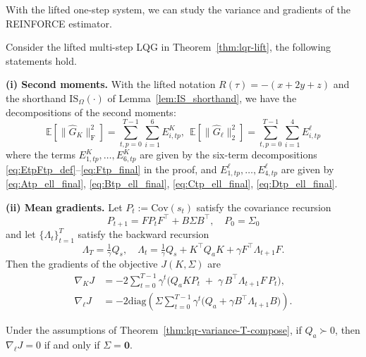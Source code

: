 With the lifted one-step system, we can study the variance and gradients of the REINFORCE estimator.


\begin{theorem}
\label{thm:lqr-variance-T-compose}
Consider the lifted multi-step LQG in Theorem~\ref{thm:lqr-lift}, the following statements hold.

\textbf{(i) Second moments.}
With the lifted notation $R(\tau)=-(x+2y+z)$ and the shorthand
$\mathrm{IS}_\Omega(\cdot)$ of Lemma~\ref{lem:IS_shorthand}, we have the decompositions of the second moments:
$$
\mathbb E\!\left[\|\widehat G_K\|_{\mathrm F}^2\right]=\!\!\!\sum_{t,p=0}^{T-1}\sum_{i=1}^{6}E^{K}_{i,tp},\ \ 
\mathbb E\!\left[\|\widehat G_\ell\|_{2}^2\right]=\!\!\!\sum_{t,p=0}^{T-1}\sum_{i=1}^{4}E^{\ell}_{i,tp}
$$
where the terms $E^{K}_{1,tp},\dots,E^{K}_{6,tp}$ are given by the six-term decompositions \eqref{eq:EtpFtp_def}--\eqref{eq:Ftp_final} in the proof, and $E^{\ell}_{1,tp},\dots,E^{\ell}_{4,tp}$ are given by
\eqref{eq:Atp_ell_final}, \eqref{eq:Btp_ell_final}, \eqref{eq:Ctp_ell_final}, \eqref{eq:Dtp_ell_final}.

\textbf{(ii) Mean gradients.}
Let $P_t:=\mathrm{Cov}(s_t)$ satisfy the covariance recursion
\[
P_{t+1}=F P_t F^\top + B\Sigma B^\top,\quad P_0=\Sigma_0
\]
and let $\{\Lambda_t\}_{t=1}^{T}$ satisfy the backward recursion
\[
\Lambda_T=\tfrac{1}{\gamma}Q_s,\quad
\Lambda_t=\tfrac{1}{\gamma}Q_s + K^\top Q_a K + \gamma F^\top \Lambda_{t+1} F.
\]
Then the gradients of the objective $J(K,\Sigma)$ are
\begin{align}
\nabla_K J
&=
-2\sum_{t=0}^{T-1}\gamma^{t}\Big( Q_a K P_t \;+\; \gamma\, B^\top \Lambda_{t+1} F\, P_t \Big)\label{eq:mean_grad_K},\!\!\\
\nabla_{\ell} J 
&=
-2\mathrm{diag}(\Sigma\sum_{t=0}^{T-1}\gamma^t\Big( Q_a + \gamma B^\top \Lambda_{t+1} B \Big)).
\end{align}
\end{theorem}

\begin{corollary}
\label{cor:lqg_stationary}
Under the assumptions of Theorem~\ref{thm:lqr-variance-T-compose}, if $Q_a \succ 0$, then $\nabla_\ell J=0$ if and only if $\Sigma=\mathbf 0$.
\end{corollary}

